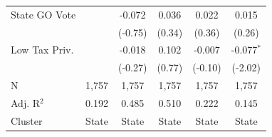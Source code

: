 \begin{tabular*}{\textwidth}{@{\extracolsep{\fill}}lccccc}
   State GO Vote        &              & -0.072         & 0.036         & 0.022          & 0.015\\   
                        &              & (-0.75)       & (0.34)       & (0.36)        & (0.26)\\   
   Low Tax Priv.        &              & -0.018         & 0.102         & -0.007         & -0.077$^{*}$\\   
                        &              & (-0.27)       & (0.77)       & (-0.10)       & (-2.02)\\   
   \hline
   N         & 1,757        & 1,757          & 1,757         & 1,757          & 1,757\\  
   Adj. R$^2$       & 0.192        & 0.485          & 0.510         & 0.222          & 0.145\\  
   Cluster              & State & State & State & State & State\\  
   \bottomrule
\end{tabular*}
\par\endgroup
